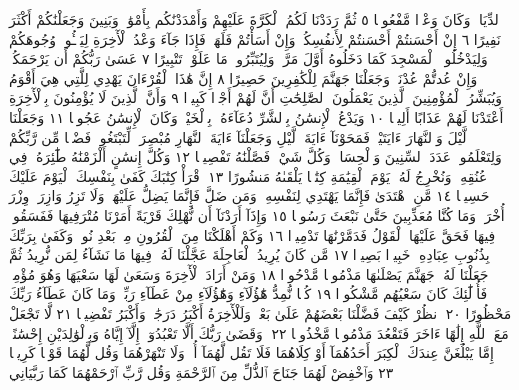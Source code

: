 ٱلدِّيَارِۚ وَكَانَ وَعْدࣰا مَّفْعُولࣰا ٥ ثُمَّ رَدَدْنَا لَكُمُ ٱلْكَرَّةَ
عَلَيْهِمْ وَأَمْدَدْنَٰكُم بِأَمْوَٰلࣲ وَبَنِينَ وَجَعَلْنَٰكُمْ أَكْثَرَ نَفِيرًا ٦
إِنْ أَحْسَنتُمْ أَحْسَنتُمْ لِأَنفُسِكُمْۖ وَإِنْ أَسَأْتُمْ فَلَهَاۚ فَإِذَا
جَآءَ وَعْدُ ٱلْأٓخِرَةِ لِيَسُ͏ࣳٓـُٔوا۟ وُجُوهَكُمْ وَلِيَدْخُلُوا۟ ٱلْمَسْجِدَ
كَمَا دَخَلُوهُ أَوَّلَ مَرَّةࣲ وَلِيُتَبِّرُوا۟ مَا عَلَوْا۟ تَتْبِيرًا ٧
عَسَىٰ رَبُّكُمْ أَن يَرْحَمَكُمْۚ وَإِنْ عُدتُّمْ عُدْنَاۚ وَجَعَلْنَا جَهَنَّمَ لِلْكَٰفِرِينَ
حَصِيرًا ٨ إِنَّ هَٰذَا ٱلْقُرْءَانَ يَهْدِي لِلَّتِي هِيَ أَقْوَمُ وَيُبَشِّرُ
ٱلْمُؤْمِنِينَ ٱلَّذِينَ يَعْمَلُونَ ٱلصَّٰلِحَٰتِ أَنَّ لَهُمْ أَجْرࣰا كَبِيرࣰا ٩
وَأَنَّ ٱلَّذِينَ لَا يُؤْمِنُونَ بِٱلْأٓخِرَةِ أَعْتَدْنَا لَهُمْ عَذَابًا أَلِيمࣰا ١٠
وَيَدْعُ ٱلْإِنسَٰنُ بِٱلشَّرِّ دُعَآءَهُۥ بِٱلْخَيْرِۖ وَكَانَ ٱلْإِنسَٰنُ عَجُولࣰا ١١
وَجَعَلْنَا ٱلَّيْلَ وَٱلنَّهَارَ ءَايَتَيْنِۖ فَمَحَوْنَآ ءَايَةَ ٱلَّيْلِ وَجَعَلْنَآ ءَايَةَ
ٱلنَّهَارِ مُبْصِرَةࣰ لِّتَبْتَغُوا۟ فَضْلࣰا مِّن رَّبِّكُمْ وَلِتَعْلَمُوا۟ عَدَدَ
ٱلسِّنِينَ وَٱلْحِسَابَۚ وَكُلَّ شَيْءࣲ فَصَّلْنَٰهُ تَفْصِيلࣰا ١٢ وَكُلَّ إِنسَٰنٍ
أَلْزَمْنَٰهُ طَٰٓئِرَهُۥ فِي عُنُقِهِۦۖ وَنُخْرِجُ لَهُۥ يَوْمَ ٱلْقِيَٰمَةِ كِتَٰبࣰا يَلْقَىٰهُ
مَنشُورًا ١٣ ٱقْرَأْ كِتَٰبَكَ كَفَىٰ بِنَفْسِكَ ٱلْيَوْمَ عَلَيْكَ حَسِيبࣰا ١٤
مَّنِ ٱهْتَدَىٰ فَإِنَّمَا يَهْتَدِي لِنَفْسِهِۦۖ وَمَن ضَلَّ فَإِنَّمَا يَضِلُّ
عَلَيْهَاۚ وَلَا تَزِرُ وَازِرَةࣱ وِزْرَ أُخْرَىٰۗ وَمَا كُنَّا مُعَذِّبِينَ حَتَّىٰ نَبْعَثَ
رَسُولࣰا ١٥ وَإِذَآ أَرَدْنَآ أَن نُّهْلِكَ قَرْيَةً أَمَرْنَا مُتْرَفِيهَا فَفَسَقُوا۟ فِيهَا
فَحَقَّ عَلَيْهَا ٱلْقَوْلُ فَدَمَّرْنَٰهَا تَدْمِيرࣰا ١٦ وَكَمْ أَهْلَكْنَا مِنَ ٱلْقُرُونِ
مِنۢ بَعْدِ نُوحࣲۗ وَكَفَىٰ بِرَبِّكَ بِذُنُوبِ عِبَادِهِۦ خَبِيرَۢا بَصِيرࣰا ١٧
مَّن كَانَ يُرِيدُ ٱلْعَاجِلَةَ عَجَّلْنَا لَهُۥ فِيهَا مَا نَشَآءُ لِمَن نُّرِيدُ ثُمَّ
جَعَلْنَا لَهُۥ جَهَنَّمَ يَصْلَىٰهَا مَذْمُومࣰا مَّدْحُورࣰا ١٨ وَمَنْ أَرَادَ
ٱلْأٓخِرَةَ وَسَعَىٰ لَهَا سَعْيَهَا وَهُوَ مُؤْمِنࣱ فَأُو۟لَٰٓئِكَ كَانَ
سَعْيُهُم مَّشْكُورࣰا ١٩ كُلࣰّا نُّمِدُّ هَٰٓؤُلَآءِ وَهَٰٓؤُلَآءِ مِنْ
عَطَآءِ رَبِّكَۚ وَمَا كَانَ عَطَآءُ رَبِّكَ مَحْظُورًا ٢٠ ٱنظُرْ كَيْفَ
فَضَّلْنَا بَعْضَهُمْ عَلَىٰ بَعْضࣲۚ وَلَلْأٓخِرَةُ أَكْبَرُ دَرَجَٰتࣲ وَأَكْبَرُ
تَفْضِيلࣰا ٢١ لَّا تَجْعَلْ مَعَ ٱللَّهِ إِلَٰهًا ءَاخَرَ فَتَقْعُدَ مَذْمُومࣰا
مَّخْذُولࣰا ٢٢۞ وَقَضَىٰ رَبُّكَ أَلَّا تَعْبُدُوٓا۟ إِلَّآ إِيَّاهُ وَبِٱلْوَٰلِدَيْنِ إِحْسَٰنًاۚ
إِمَّا يَبْلُغَنَّ عِندَكَ ٱلْكِبَرَ أَحَدُهُمَآ أَوْ كِلَاهُمَا فَلَا تَقُل لَّهُمَآ
أُفࣲّ وَلَا تَنْهَرْهُمَا وَقُل لَّهُمَا قَوْلࣰا كَرِيمࣰا ٢٣ وَٱخْفِضْ لَهُمَا
جَنَاحَ ٱلذُّلِّ مِنَ ٱلرَّحْمَةِ وَقُل رَّبِّ ٱرْحَمْهُمَا كَمَا رَبَّيَانِي
